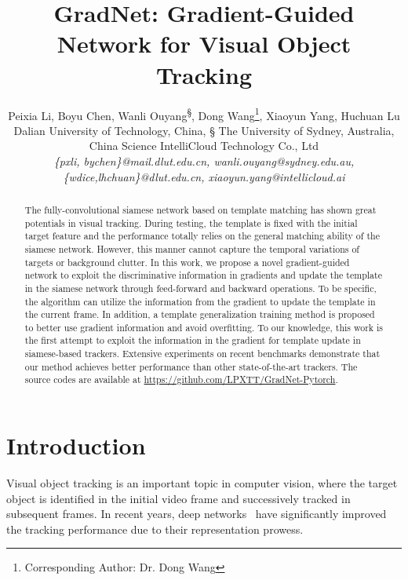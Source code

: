 \documentclass[10pt,twocolumn,letterpaper]{article}
\begin{document}
\title{GradNet: Gradient-Guided Network for Visual Object Tracking}

\author{Peixia Li\textsuperscript{\dag}, Boyu Chen\textsuperscript{\dag}, Wanli Ouyang\textsuperscript{\S}, Dong Wang\textsuperscript{\dag}\thanks{Corresponding Author: Dr. Dong Wang}, Xiaoyun Yang\textsuperscript{\ddag},
Huchuan Lu\textsuperscript{\dag} \\
{\dag} Dalian University of Technology, China,
{\S} The University of Sydney, Australia, \\
{\ddag} China Science IntelliCloud Technology Co., Ltd \\
{\sl{\small{\{pxli, bychen\}@mail.dlut.edu.cn, wanli.ouyang@sydney.edu.au, \{wdice,lhchuan\}@dlut.edu.cn, xiaoyun.yang@intellicloud.ai}}}
}






\maketitle
\ificcvfinal\thispagestyle{empty}\fi

\begin{abstract}
	The fully-convolutional siamese network based on template matching has shown great potentials in visual tracking.
	During testing, the template is fixed with the initial target feature and the performance totally relies on the general matching ability of the siamese network.
	However, this manner cannot capture the temporal variations of targets or background clutter.
In this work, we propose a novel gradient-guided network to exploit the discriminative information in gradients and update the template in the siamese network through feed-forward and backward operations.	
To be specific, the algorithm can utilize the information from the gradient to update the template in the current frame.
In addition, a template generalization training method is proposed to better use gradient information and avoid overfitting.
To our knowledge, this work is the first attempt to exploit the information in the gradient for template update in siamese-based trackers. Extensive experiments on recent benchmarks demonstrate that our method achieves better performance than other state-of-the-art trackers.
	The source codes are available at \href{https://github.com/LPXTT/GradNet-Pytorch}{https://github.com/LPXTT/GradNet-Pytorch}.
\end{abstract}

\section{Introduction}
Visual object tracking is an important topic in computer vision, where the target object is identified in the initial video frame and successively tracked in subsequent frames.
In recent years, deep networks~\cite{Wang-CVPR16-STCT,Bertinetto-ECCV16-SiamesFC,Huang-CoRR17-east,zhang-eccv2018-structsiam,Li-PR18-survey, iccv19_SPLT}
have significantly improved the tracking performance due to their representation prowess.
\end{document}
